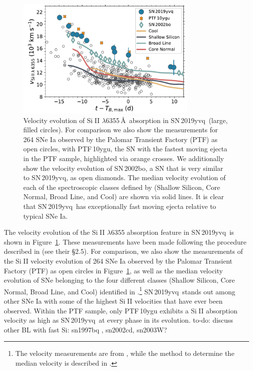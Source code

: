 \documentclass[twocolumn]{aastex63}
\def\ion#1#2{#1$\;${\footnotesize\rm{#2}}\relax}
\newcommand{\todo}[1]{{\color{magenta} to-do: {#1}}}
\newcommand{\sn}{SN\,2019yvq}
\begin{document}
\begin{figure}
    \centering
    \includegraphics[width=3.5in]{./figures/vel_evolution.pdf}
    \caption{Velocity evolution of \ion{Si}{II} $\lambda$6355\,\AA\
    absorption in \sn\ (large, filled circles). For comparison we also show
    the measurements for 264 SNe Ia observed by the Palomar Transient Factory
    (PTF) as open circles, with PTF\,10ygu, the SN with the fastest moving
    ejecta in the PTF sample, highlighted via orange crosses. We additionally
    show the velocity evolution of SN\,2002bo, a SN that is very similar to
    \sn, as open diamonds. The median velocity evolution of each of the
    spectroscopic classes defined by \citet{Branch06} (Shallow Silicon, Core
    Normal, Broad Line, and Cool) are shown via solid lines. It is clear that
    \sn\ has exceptionally fast moving ejecta relative to typical SNe Ia.}
    \label{fig:vel_evo}
\end{figure}

The velocity evolution of the \ion{Si}{II} $\lambda$6355 absorption feature
in \sn\ is shown in Figure~\ref{fig:vel_evo}. These measurements have been
made following the procedure described in \citet{Maguire14} (see their
\S2.5). For comparison, we also show the \citet{Maguire14} measurements of
the \ion{Si}{II} velocity evolution of 264 SNe Ia observed by the Palomar
Transient Factory (PTF) as open circles in Figure~\ref{fig:vel_evo}, as well
as the median velocity evolution of SNe belonging to the four different
classes (Shallow Silicon, Core Normal, Broad Line, and Cool) identified in
\citet{Branch06}.\footnote{The velocity measurements are from
\citealt{Blondin12}, while the method to determine the median velocity is
described in \citealt{Miller18}.} \sn\ stands out among other SNe Ia with
some of the highest \ion{Si}{II} velocities that have ever been observed.
Within the PTF sample, only PTF\,10ygu exhibits a \ion{Si}{II} absorption
velocity as high as \sn\ at every phase in its evolution. \todo{discuss other
BL with fast Si: sn1997bq , sn2002cd, sn2003W?}
\end{document}
